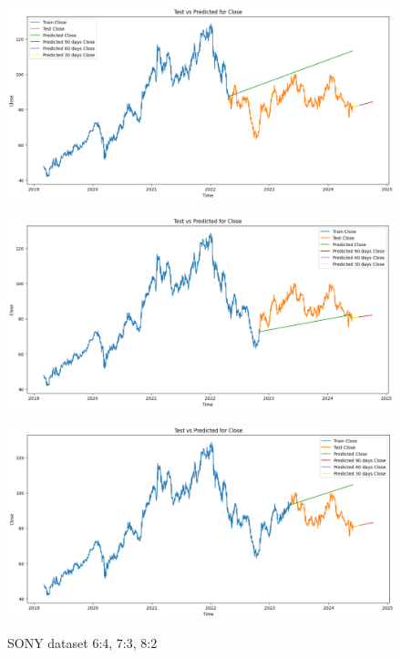 \documentclass[conference]{IEEEtran}
\begin{document}
\begin{figure}[H]
    \centering
    \begin{minipage}{0.15\textwidth}
    \centering
    \includegraphics[width=1\textwidth]{Image/VARMA/SONY/6_4.png}
   
    \label{fig:1}
    \end{minipage}%
    \begin{minipage}{0.15\textwidth}
    \centering
    \includegraphics[width=1\textwidth]{Image/VARMA/SONY/7_3.png}
  
    \label{fig:2}
    \end{minipage}%
    \begin{minipage}{0.15\textwidth}
    \centering
    \includegraphics[width=1\textwidth]{Image/VARMA/SONY/8_2.png}

    \label{fig:3}
    \end{minipage}
    \caption{ SONY dataset 6:4, 7:3, 8:2}
\end{figure}
\end{document}
